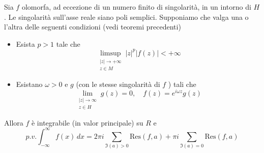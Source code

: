 \begin{theorem}\label{thm:valor-principale}
    Sia \(f\) olomorfa, ad eccezione di un numero finito di singolarità, in un
    intorno di \(H\). Le singolarità sull'asse reale siano poli semplici.
    Supponiamo che valga una o l'altra delle seguenti condizioni (vedi teoremi
    precedenti)
\begin{itemize}[label = --]
    \item Esista \(p > 1\) tale che \[\limsup_{\substack{|z| \to +\infty \\ z \in
      M}}|z|^{p} |f{(z)}| < +\infty \] 
    \item Esistano \(\omega > 0\) e \(g\) (con le stesse singolarità di \(f\) )
        tali che
        \[
          \lim_{\substack{|z| \to \infty \\ z \in H}} g{(z)} = 0, \quad f{(z)} = e^{i
          \omega z}g{(z)}
        \]
\end{itemize}
Allora \(f\) è integrabile (in valor principale) su \(R\) e 
\[
    p.v. \int_{-\infty}^{\infty} f{(x)} \,dx = 2\pi i \sum_{\Im {(a)} > 0}
    \mathrm{Res}{(f, a)} + \pi i \sum_{\Im {(a)} = 0} \mathrm{Res}{(f, a)}
\]
\end{theorem}
